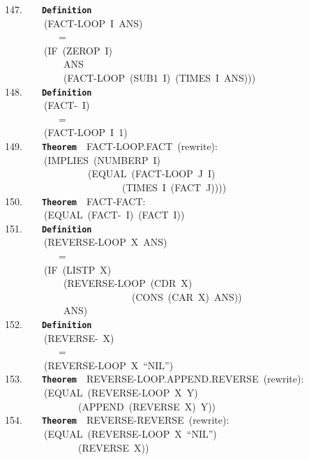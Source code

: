 \documentclass[11pt]{book}
\newenvironment{pubasis}{\begin{flushleft}\ttfamily\small}{\normalsize\rmfamily\end{flushleft}}
\newcommand{\axiomordefinition}[1]{\vspace{6pt}\texttt{\textbf{#1}}}
\begin{document}
\begin{pubasis}
147.~~~~\axiomordefinition{Definition}\\
~~~~~~~~(FACT-LOOP~I~ANS)\\
~~~~~~~~~~~=\\
~~~~~~~~(IF~(ZEROP~I)\\
~~~~~~~~~~~~ANS\\
~~~~~~~~~~~~(FACT-LOOP~(SUB1~I)~(TIMES~I~ANS)))\\

148.~~~~\axiomordefinition{Definition}\\
~~~~~~~~(FACT-~I)\\
~~~~~~~~~~~=\\
~~~~~~~~(FACT-LOOP~I~1)\\

149.~~~~\axiomordefinition{Theorem}~~FACT-LOOP.FACT~(rewrite):\\
~~~~~~~~(IMPLIES~(NUMBERP~I)\\
~~~~~~~~~~~~~~~~~(EQUAL~(FACT-LOOP~J~I)\\
~~~~~~~~~~~~~~~~~~~~~~~~(TIMES~I~(FACT~J))))\\

150.~~~~\axiomordefinition{Theorem}~~FACT-FACT:\\
~~~~~~~~(EQUAL~(FACT-~I)~(FACT~I))\\

151.~~~~\axiomordefinition{Definition}\\
~~~~~~~~(REVERSE-LOOP~X~ANS)\\
~~~~~~~~~~~=\\
~~~~~~~~(IF~(LISTP~X)\\
~~~~~~~~~~~~(REVERSE-LOOP~(CDR~X)\\
~~~~~~~~~~~~~~~~~~~~~~~~~~(CONS~(CAR~X)~ANS))\\
~~~~~~~~~~~~ANS)\\

152.~~~~\axiomordefinition{Definition}\\
~~~~~~~~(REVERSE-~X)\\
~~~~~~~~~~~=\\
~~~~~~~~(REVERSE-LOOP~X~``NIL'')\\

153.~~~~\axiomordefinition{Theorem}~~REVERSE-LOOP.APPEND.REVERSE~(rewrite):\\
~~~~~~~~(EQUAL~(REVERSE-LOOP~X~Y)\\
~~~~~~~~~~~~~~~(APPEND~(REVERSE~X)~Y))\\

154.~~~~\axiomordefinition{Theorem}~~REVERSE-REVERSE~(rewrite):\\
~~~~~~~~(EQUAL~(REVERSE-LOOP~X~``NIL'')\\
~~~~~~~~~~~~~~~(REVERSE~X))\\


\end{pubasis}
\end{document}
